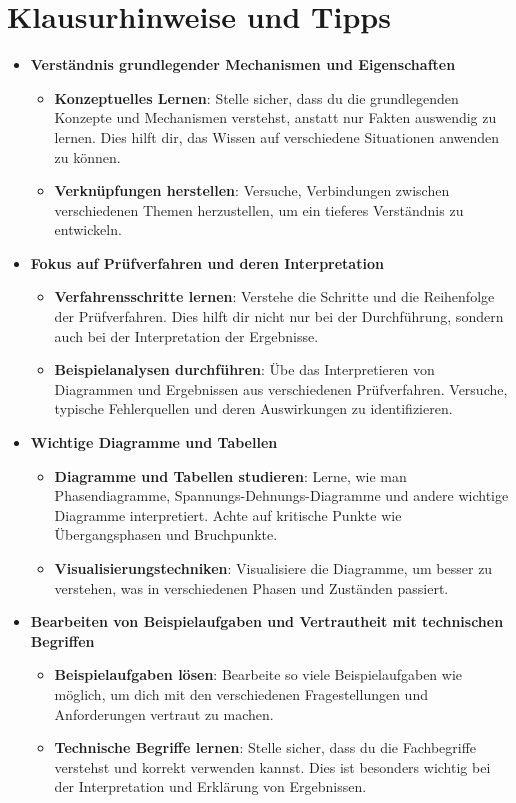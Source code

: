\documentclass[a4paper,12pt]{article}
\begin{document}
\newpage

\section{Klausurhinweise und Tipps}

\begin{itemize}
    \item \textbf{Verständnis grundlegender Mechanismen und Eigenschaften}
    \begin{itemize}
        \item \textbf{Konzeptuelles Lernen}: Stelle sicher, dass du die grundlegenden Konzepte und Mechanismen verstehst, anstatt nur Fakten auswendig zu lernen. Dies hilft dir, das Wissen auf verschiedene Situationen anwenden zu können.
        \item \textbf{Verknüpfungen herstellen}: Versuche, Verbindungen zwischen verschiedenen Themen herzustellen, um ein tieferes Verständnis zu entwickeln.
    \end{itemize}
    \item \textbf{Fokus auf Prüfverfahren und deren Interpretation}
    \begin{itemize}
        \item \textbf{Verfahrensschritte lernen}: Verstehe die Schritte und die Reihenfolge der Prüfverfahren. Dies hilft dir nicht nur bei der Durchführung, sondern auch bei der Interpretation der Ergebnisse.
        \item \textbf{Beispielanalysen durchführen}: Übe das Interpretieren von Diagrammen und Ergebnissen aus verschiedenen Prüfverfahren. Versuche, typische Fehlerquellen und deren Auswirkungen zu identifizieren.
    \end{itemize}
    \item \textbf{Wichtige Diagramme und Tabellen}
    \begin{itemize}
        \item \textbf{Diagramme und Tabellen studieren}: Lerne, wie man Phasendiagramme, Spannungs-Dehnungs-Diagramme und andere wichtige Diagramme interpretiert. Achte auf kritische Punkte wie Übergangsphasen und Bruchpunkte.
        \item \textbf{Visualisierungstechniken}: Visualisiere die Diagramme, um besser zu verstehen, was in verschiedenen Phasen und Zuständen passiert.
    \end{itemize}
    \item \textbf{Bearbeiten von Beispielaufgaben und Vertrautheit mit technischen Begriffen}
    \begin{itemize}
        \item \textbf{Beispielaufgaben lösen}: Bearbeite so viele Beispielaufgaben wie möglich, um dich mit den verschiedenen Fragestellungen und Anforderungen vertraut zu machen.
        \item \textbf{Technische Begriffe lernen}: Stelle sicher, dass du die Fachbegriffe verstehst und korrekt verwenden kannst. Dies ist besonders wichtig bei der Interpretation und Erklärung von Ergebnissen.
    \end{itemize}
\end{itemize}
\end{document}
